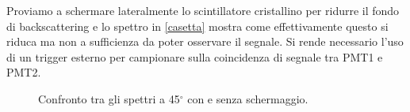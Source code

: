Proviamo a schermare lateralmente lo scintillatore cristallino per ridurre il fondo di backscattering e lo spettro in \autoref{casetta} mostra come effettivamente questo si riduca ma non a sufficienza da poter osservare il segnale. Si rende necessario l'uso di un trigger esterno per campionare sulla coincidenza di segnale tra PMT1 e PMT2.

\begin{figure}
\centering


\caption{Confronto tra gli spettri a 45$^{\circ}$ con e senza schermaggio.}
\label{casetta}
\end{figure}

